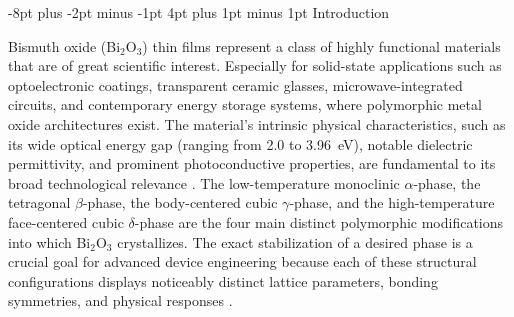 \documentclass[10pt]{NSP1}
\makeatletter
\renewcommand\section{\@startsection{section}{1}{\z@}%
  {-8pt plus -2pt minus -1pt}%
  {4pt plus 1pt minus 1pt}%
  {\normalsize\bfseries}}
\makeatother
\begin{document}
\maketitle

\section{Introduction}

Bismuth oxide (Bi$_2$O$_3$) thin films represent a class of highly functional materials that are of great scientific interest. Especially for solid-state applications such as optoelectronic coatings, transparent ceramic glasses, microwave-integrated circuits, and contemporary energy storage systems, where polymorphic metal oxide architectures exist. The material's intrinsic physical characteristics, such as its wide optical energy gap (ranging from 2.0 to 3.96~eV), notable dielectric permittivity, and prominent photoconductive properties, are fundamental to its broad technological relevance \cite{R1,R2}. The low-temperature monoclinic $\alpha$-phase, the tetragonal $\beta$-phase, the body-centered cubic $\gamma$-phase, and the high-temperature face-centered cubic $\delta$-phase are the four main distinct polymorphic modifications into which Bi$_2$O$_3$ crystallizes. The exact stabilization of a desired phase is a crucial goal for advanced device engineering because each of these structural configurations displays noticeably distinct lattice parameters, bonding symmetries, and physical responses \cite{R3,R4}.
\end{document}
